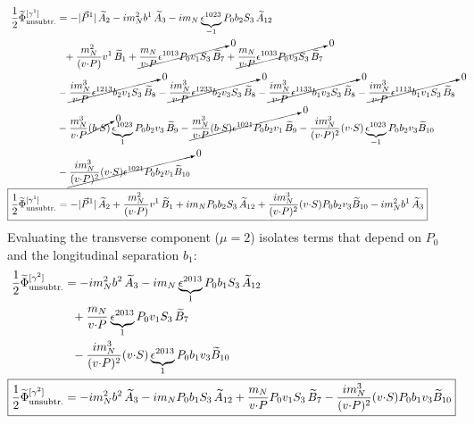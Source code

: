 \begin{align}
    \frac{1}{2}\widetilde \Phi^{[\gamma^{1}]}_{\unsub} & = 
		-|\vec{P}^1|\, \tAmp_2 - i \mN^2 \bvec^1\, \tAmp_3
		- i \mN \underbrace{\epsilon^{1 023}}_{-1} P_0 \bvec_2 S_3\, \tAmp_{12} \nonumber \\ &
		~~+ \frac{\mN^2}{(v \tcdot P)} v^1\, \tBmp_1 
		+ \cancelto{0}{\frac{\mN}{v \tcdot P} \epsilon^{1 013} P_0 v_1 S_3\, \tBmp_7  }+ \cancelto{0}{\frac{\mN}{v \tcdot P} \epsilon^{1 033} P_0 v_3 S_3\, \tBmp_7  } \nonumber \\ &
		- \cancelto{0}{\frac{ i \mN^3}{v \tcdot P} \epsilon^{1 213} \bvec_2 v_1 S_3\, \tBmp_8}- \cancelto{0}{\frac{ i \mN^3}{v \tcdot P} \epsilon^{1 233} \bvec_2 v_3 S_3\, \tBmp_8} - \cancelto{0}{\frac{ i \mN^3}{v \tcdot P} \epsilon^{1 133} \bvec_1 v_3 S_3\, \tBmp_8}- \cancelto{0}{\frac{ i \mN^3}{v \tcdot P} \epsilon^{1 113} \bvec_1 v_1 S_3\, \tBmp_8}\nonumber \\ & 
        - \frac{\mN^3}{v \tcdot P} \cancelto{0}{(\bvec \tcdot S)} \underbrace{\epsilon^{1 023}}_{1} P_0 \bvec_2 v_3\, \tBmp_9 - \cancelto{0}{\frac{\mN^3}{v \tcdot P} (\bvec \tcdot S) \epsilon^{1 021} P_0 \bvec_2 v_1\, \tBmp_9} - \frac{i \mN^3}{(v \tcdot P)^2} (v \tcdot S) \underbrace{\epsilon^{1 023}}_{-1} P_0 \bvec_2 v_3 \tBmp_{10} \nonumber \\ & - \cancelto{0}{\frac{i \mN^3}{(v \tcdot P)^2} (v \tcdot S) \epsilon^{1 021} P_0 \bvec_2 v_1 \tBmp_{10}}\\
  \Aboxed{ \frac{1}{2}\widetilde \Phi^{[\gamma^{1}]}_{\unsub} & =-|\vec{P}^1|\, \tAmp_2+ \frac{\mN^2}{(v \tcdot P)} v^1\, \tBmp_1 
		+ i \mN  P_0 \bvec_2 S_3\, \tAmp_{12}+ \frac{i \mN^3}{(v \tcdot P)^2} (v \tcdot S)  P_0 \bvec_2 v_3 \tBmp_{10}- i \mN^2 \bvec^1\, \tAmp_3}
\end{align}
\endgroup
Evaluating the transverse component ($\mu=2$) isolates terms that depend on $P_0$ and the longitudinal separation $b_1$:
\begin{align}
    \frac{1}{2}\widetilde \Phi^{[\gamma^2]}_{\unsub} & = 
		 - i \mN^2 \bvec^2\, \tAmp_3
		- i \mN \underbrace{\epsilon^{2 0 1 3}}_{1} P_0 \bvec_1 S_3\, \tAmp_{12} \nonumber \\ &
		~~
		+ \frac{\mN}{v \tcdot P} \underbrace{\epsilon^{2 0 1 3}}_{1} P_0 v_1 S_3\, \tBmp_7  
		 \nonumber \\ &
		~~
		- \frac{i \mN^3}{(v \tcdot P)^2} (v \tcdot S) \underbrace{\epsilon^{2 0 1 3}}_{1} P_0 \bvec_1 v_3 \tBmp_{10}\\
  \Aboxed{\frac{1}{2}\widetilde \Phi^{[\gamma^2]}_{\unsub} & =- i \mN^2 \bvec^2\, \tAmp_3
		- i \mN  P_0 \bvec_1 S_3\, \tAmp_{12}+ \frac{\mN}{v \tcdot P}  P_0 v_1 S_3\, \tBmp_7- \frac{i \mN^3}{(v \tcdot P)^2} (v \tcdot S) P_0 \bvec_1 v_3 \tBmp_{10}}
\end{align}
